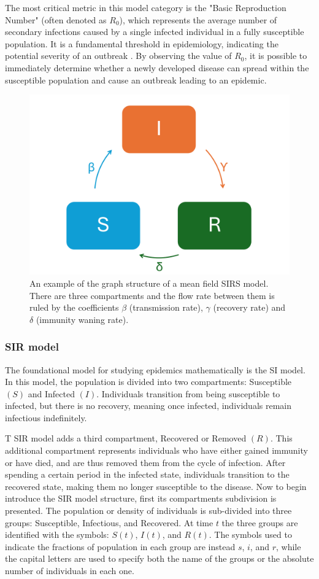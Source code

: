The most critical metric in this model category is the "Basic Reproduction Number" (often denoted as $R_0$), which represents the average number of secondary infections caused by a single infected individual in a fully susceptible population. It is a fundamental threshold in epidemiology, indicating the potential severity of an outbreak \cite{Hernandez_Vargas_2022}. By observing the value of $R_0$, it is possible to immediately determine whether a newly developed disease can spread within the susceptible population and cause an outbreak leading to an epidemic.
\begin{figure}[]
	\centering
	\includegraphics[width=0.65\linewidth]{0_introduction/images_introduction/SIRS_figure_compartmental}
	\caption[SIRS example]{An example of the graph structure of a mean field SIRS model. There are three compartments and the flow rate between them is ruled by the coefficients $\beta$ (transmission rate), $\gamma$ (recovery rate) and $\delta$ (immunity waning rate).}
	\label{fig:sirsfigurecompartmental}
\end{figure}


\subsubsection{SIR model}
\label{subsec:SIR}
The foundational model for studying epidemics mathematically is the SI model. In this model, the population is divided into two compartments: Susceptible $(S)$ and Infected $(I)$. Individuals transition from being susceptible to infected, but there is no recovery, meaning once infected, individuals remain infectious indefinitely.

T SIR model adds a third compartment, Recovered or Removed $(R)$. This additional compartment represents individuals who have either gained immunity or have died, and are thus removed them from the cycle of infection. After spending a certain period in the infected state, individuals transition to the recovered state, making them no longer susceptible to the disease.
Now to begin introduce the SIR model structure, first its compartments subdivision is presented. The population or density of individuals is sub-divided into three groups: Susceptible, Infectious, and Recovered. At time $t$ the three groups are identified with the symbols: $S(t)$, $I(t)$, and $R(t)$. 
The symbols used to indicate the fractions of population in each group are instead $s$, $i$, and $r$, while the capital letters are used to specify both the name of the groups or the absolute number of individuals in each one. 

